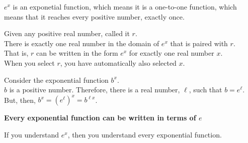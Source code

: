 \documentclass{ximera}
\begin{document}
$e^x$ is an exponetial function, which means it is a one-to-one function, which means that it reaches every positive number, exactly once. \\


\begin{observation}


Given any positive real number, called it $r$. \\

There is exactly one real number in the domain of $e^x$ that is paired with $r$. \\


That is, $r$ can be written in the form $e^x$ for exactly one real number $x$.  \\


When you select $r$, you have automatically also selected $x$.


\end{observation}








\begin{conclusion}


Consider the exponential function $b^x$. \\

$b$ is a positive number.  Therefore, there is a real number, $\ell$, such that $b = e^{\ell}$. \\


But, then, $b^x = \left( e^{\ell} \right)^x = b^{\ell x}$.


\begin{center}
\textbf{\textcolor{red!80!black}{Every exponential function can be written in terms of $e$}}
\end{center}



If you understand $e^x$, then you understand every exponential function.

\end{conclusion}
\end{document}
